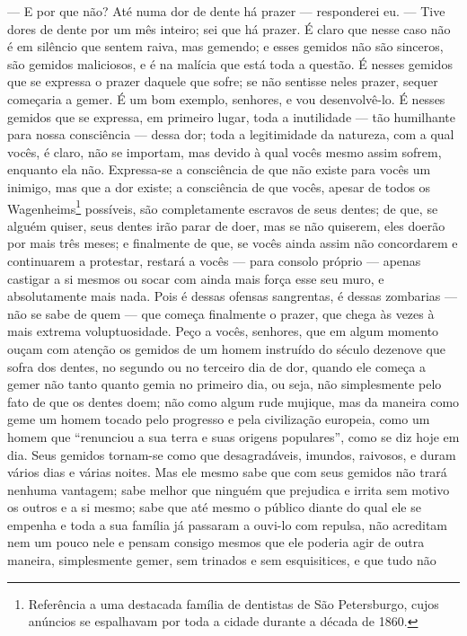 --- E por que não? Até numa dor de dente há prazer --- responderei eu. ---
Tive dores de dente por um mês inteiro; sei que há prazer. É claro que
nesse caso não é em silêncio que sentem raiva, mas gemendo; e esses
gemidos não são sinceros, são gemidos maliciosos, e é na malícia que
está toda a questão. É nesses gemidos que se expressa o prazer daquele
que sofre; se não sentisse neles prazer, sequer começaria a gemer. É um
bom exemplo, senhores, e vou desenvolvê-lo. É nesses gemidos que se
expressa, em primeiro lugar, toda a inutilidade --- tão humilhante para
nossa consciência --- dessa dor; toda a legitimidade da natureza, com a
qual vocês, é claro, não se importam, mas devido à qual vocês mesmo
assim sofrem, enquanto ela não. Expressa-se a consciência de que não
existe para vocês um inimigo, mas que a dor existe; a consciência de
que vocês, apesar de todos os Wagenheims\footnote{ Referência a uma destacada 
família de dentistas de São Petersburgo,
cujos anúncios se espalhavam por toda a cidade durante a década de
1860.} possíveis, são completamente escravos de seus dentes; de que, se alguém
quiser, seus dentes irão parar de doer, mas se não quiserem, eles
doerão por mais três meses; e finalmente de que, se vocês ainda assim
não concordarem e continuarem a protestar, restará a vocês --- para
consolo próprio --- apenas castigar a si mesmos ou socar com ainda mais
força esse seu muro, e absolutamente mais nada. Pois é dessas ofensas
sangrentas, é dessas zombarias --- não se sabe de quem --- que começa
finalmente o prazer, que chega às vezes à mais extrema voluptuosidade.
Peço a vocês, senhores, que em algum momento ouçam com atenção os
gemidos de um homem instruído do século  dezenove que sofra dos dentes, no
segundo ou no terceiro dia de dor, quando ele começa a gemer não tanto
quanto gemia no primeiro dia, ou seja, não simplesmente pelo fato de
que os dentes doem; não como algum rude mujique, mas da maneira como
geme um homem tocado pelo progresso e pela civilização europeia, como
um homem que “renunciou a sua terra e suas origens populares”, como se
diz hoje em dia. Seus gemidos tornam-se como que desagradáveis,
imundos, raivosos, e duram vários dias e várias noites. Mas ele mesmo
sabe que com seus gemidos não trará nenhuma vantagem; sabe melhor que
ninguém que prejudica e irrita sem motivo os outros e a si mesmo; sabe
que até mesmo o público diante do qual ele se empenha e toda a sua
família já passaram a ouvi-lo com repulsa, não acreditam nem um pouco
nele e pensam consigo mesmos que ele poderia agir de outra maneira,
simplesmente gemer, sem trinados e sem esquisitices, e que tudo não
